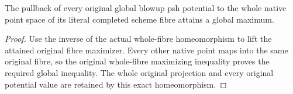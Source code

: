 \begin{lemma}
\label{lem:fc-native-completed-fibre-maximum-attainment}
\leanok
{}
The pullback of every original global blowup psh potential to the whole native
point space of its literal completed scheme fibre attains a global maximum.
\end{lemma}
\begin{proof}
Use the inverse of the actual whole-fibre homeomorphism to lift the attained
original fibre maximizer. Every other native point maps into the same original
fibre, so the original whole-fibre maximizing inequality proves the required
global inequality. The whole original projection and every original potential
value are retained by this exact homeomorphism.
\end{proof}
